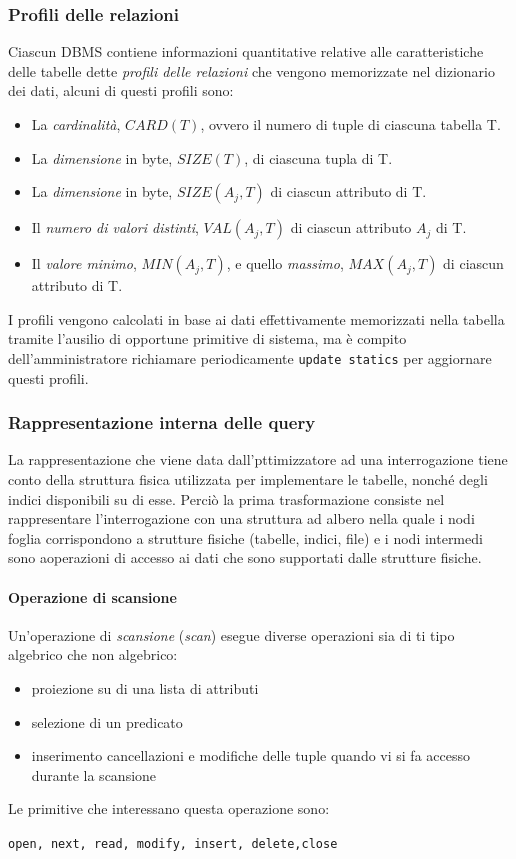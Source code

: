 \subsubsection{Profili delle relazioni}
Ciascun DBMS contiene informazioni quantitative relative alle caratteristiche delle tabelle dette \emph{profili delle relazioni} che vengono memorizzate nel dizionario dei dati, alcuni di questi profili sono:
\begin{itemize}
  \item La \emph{cardinalità}, $CARD(T)$, ovvero il numero di tuple di ciascuna tabella T.
  \item La \emph{dimensione} in byte, $SIZE(T)$, di ciascuna tupla di T.
  \item La \emph{dimensione} in byte, $SIZE (A_j,T)$ di ciascun attributo di T.
  \item Il \emph{numero di valori distinti}, $VAL(A_j,T)$ di ciascun attributo $A_j$ di T.
  \item Il \emph{valore minimo}, $MIN(A_j,T)$, e quello \emph{massimo}, $MAX(A_j,T)$ di ciascun attributo di T.
\end{itemize}
I profili vengono calcolati in base ai dati effettivamente memorizzati nella tabella tramite l'ausilio di opportune primitive di sistema, ma è compito dell'amministratore richiamare periodicamente \texttt{update statics} per aggiornare questi profili.
\subsubsection{Rappresentazione interna delle query}
La rappresentazione che viene data dall'pttimizzatore ad una interrogazione tiene conto della struttura fisica utilizzata per implementare le tabelle, nonché degli indici disponibili su di esse. Perciò la prima trasformazione consiste nel rappresentare l'interrogazione con una struttura ad albero nella quale i nodi foglia corrispondono a strutture fisiche (tabelle, indici, file) e i nodi intermedi sono aoperazioni di accesso ai dati che sono supportati dalle strutture fisiche.
\paragraph{Operazione di scansione}
Un'operazione di \emph{scansione} (\emph{scan}) esegue diverse operazioni sia di ti tipo algebrico che non algebrico:
\begin{itemize}
  \item proiezione su di una lista di attributi
  \item selezione di un predicato
  \item inserimento cancellazioni e modifiche delle tuple quando vi si fa accesso durante la scansione
\end{itemize}
Le primitive che interessano questa operazione sono:
\begin{center}
  \texttt{open, next, read, modify, insert, delete,close}
\end{center}
